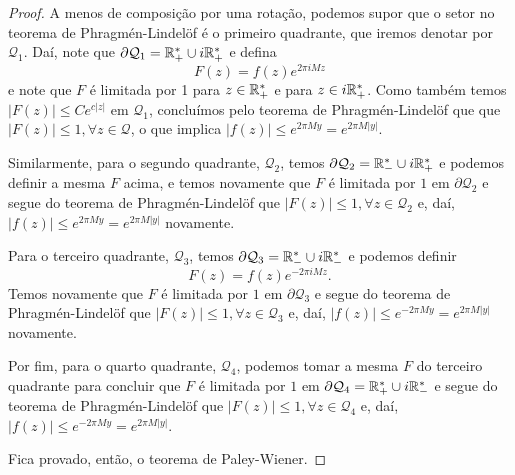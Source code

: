 \begin{proof}
            A menos de composição por uma rotação, podemos supor que
            o setor no teorema de Phragmén-Lindelöf é o primeiro quadrante,
            que iremos denotar por $\mathcal{Q}_1$. Daí, note que 
            $\partial\mathcal{Q}_1 = \mathbb{R}_+^* \cup i\mathbb{R}_+^*$ e defina
            \begin{equation*}
                F(z) = f(z)e^{2\pi i Mz}
            \end{equation*}
            e note que $F$ é limitada por 1 para $z\in\mathbb{R}_+^*$ e para
            $z\in i\mathbb{R}_+^*$. Como também temos $|F(z)| \leq Ce^{c|z|}$
            em $\mathcal{Q}_1$, concluímos pelo teorema de Phragmén-Lindelöf
            que que $|F(z)| \leq 1, \forall z\in\mathcal{Q}$, o que implica
            $|f(z)| \leq e^{2\pi M y} = e^{2\pi M|y|}$.
            
            Similarmente, para o segundo quadrante, $\mathcal{Q}_2$,
            temos $\partial\mathcal{Q}_2 = \mathbb{R}_-^* \cup i\mathbb{R}_+^*$ e 
            podemos definir a mesma $F$ acima, e temos novamente que 
            $F$ é limitada por $1$ em
            $\partial\mathcal{Q}_2$ e segue do teorema de Phragmén-Lindelöf 
            que $|F(z)| \leq 1, \forall z\in\mathcal{Q}_2$ e, daí,
            $|f(z)| \leq e^{2\pi My} = e^{2\pi M|y|}$ novamente.
            
            Para o terceiro quadrante, $\mathcal{Q}_3$,
            temos $\partial\mathcal{Q}_3 = \mathbb{R}_-^* \cup i\mathbb{R}_-^*$ e 
            podemos definir 
            \begin{equation*}
                F(z) = f(z)e^{-2\pi i Mz}.
            \end{equation*}
            Temos novamente que $F$ é limitada por $1$ em
            $\partial\mathcal{Q}_3$ e segue do teorema de Phragmén-Lindelöf 
            que $|F(z)| \leq 1, \forall z\in\mathcal{Q}_3$ e, daí,
            $|f(z)| \leq e^{-2\pi My} = e^{2\pi M|y|}$ novamente.
            
            Por fim, para o quarto quadrante, $\mathcal{Q}_4$, podemos
            tomar a mesma $F$ do terceiro quadrante para concluir que 
            $F$ é limitada por $1$ em 
            $\partial\mathcal{Q}_4 = \mathbb{R}_+^* \cup i\mathbb{R}_-^*$ e segue
            do teorema de Phragmén-Lindelöf que $|F(z)| \leq 1,
            \forall z\in\mathcal{Q}_4$ e, daí, $|f(z)| \leq e^{-2\pi My}
            = e^{2\pi M|y|}$.
            
            Fica provado, então, o teorema de Paley-Wiener.
        \end{proof}
        
